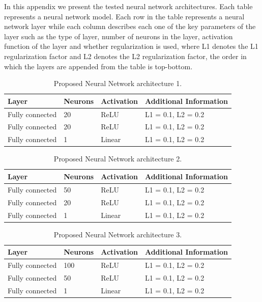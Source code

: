 \documentclass[preprint,12pt]{elsarticle}%
\begin{document}
In this appendix we present the tested neural network architectures. Each table represents a neural network model. Each row in the table represents a neural network layer while each column describes each one of the key parameters of the layer such as the type of layer, number of neurons in the layer, activation function of the layer and whether regularization is used, where L1 denotes the L1 regularization factor and L2 denotes the L2 regularization factor, the order in which the layers are appended from the table is top-bottom.

\begin{table}[!htb]
\centering
\caption{Proposed Neural Network architecture 1.}%
\begin{tabular}
[c]{llll}\hline
Layer & Neurons & Activation & Additional Information\\\hline\hline
Fully connected & 20 & ReLU & L1 = 0.1, L2 = 0.2\\
Fully connected & 20 & ReLU & L1 = 0.1, L2 = 0.2\\
Fully connected & 1 & Linear & L1 = 0.1, L2 = 0.2\\\hline
\end{tabular}
\label{table:proposed_nn_1}%
\end{table}

\begin{table}[!htb]
\centering
\caption{Proposed Neural Network architecture 2.}%
\begin{tabular}
[c]{llll}\hline
Layer & Neurons & Activation & Additional Information\\\hline\hline
Fully connected & 50 & ReLU & L1 = 0.1, L2 = 0.2\\
Fully connected & 20 & ReLU & L1 = 0.1, L2 = 0.2\\
Fully connected & 1 & Linear & L1 = 0.1, L2 = 0.2\\\hline
\end{tabular}
\label{table:proposed_nn_2}%
\end{table}

\begin{table}[!htb]
\centering
\caption{Proposed Neural Network architecture 3.}%
\begin{tabular}
[c]{llll}\hline
Layer & Neurons & Activation & Additional Information\\\hline
Fully connected & 100 & ReLU & L1 = 0.1, L2 = 0.2\\
Fully connected & 50 & ReLU & L1 = 0.1, L2 = 0.2\\
Fully connected & 1 & Linear & L1 = 0.1, L2 = 0.2\\\hline
\end{tabular}
\label{table:proposed_nn_3}%
\end{table}
\end{document}
